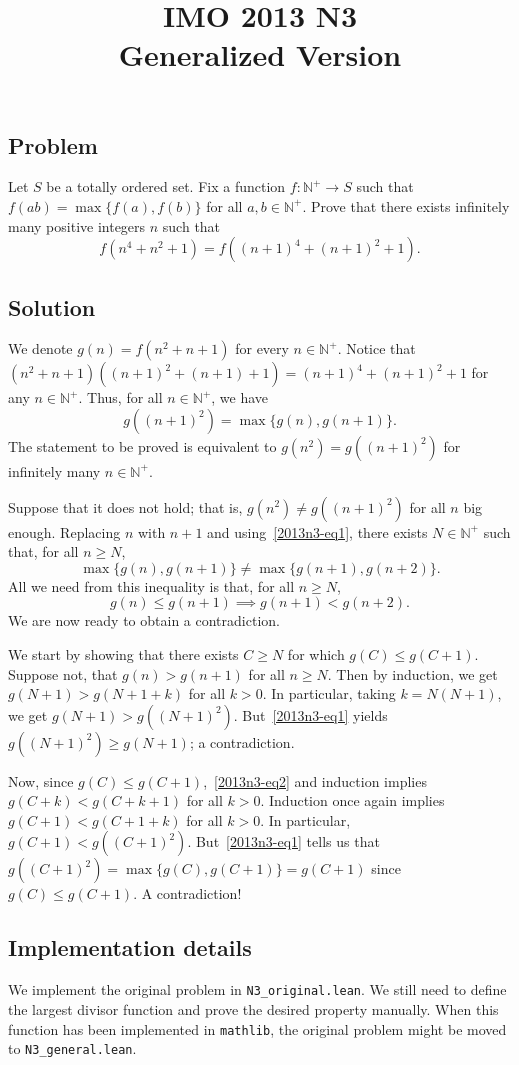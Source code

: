 \documentclass{article}
\title{IMO 2013 N3 \\ Generalized Version}
\author{}
\date{}
\newcommand{\N}{\mathbb{N}}
\begin{document}
\maketitle



\subsection*{Problem}

Let $S$ be a totally ordered set.
Fix a function $f : \N^+ \to S$ such that $f(ab) = \max\{f(a), f(b)\}$ for all $a, b \in \N^+$.
Prove that there exists infinitely many positive integers $n$ such that
\[ f(n^4 + n^2 + 1) = f((n + 1)^4 + (n + 1)^2 + 1). \]



\subsection*{Solution}

We denote $g(n) = f(n^2 + n + 1)$ for every $n \in \N^+$.
Notice that $(n^2 + n + 1)((n + 1)^2 + (n + 1) + 1) = (n + 1)^4 + (n + 1)^2 + 1$ for any $n \in \N^+$.
Thus, for all $n \in \N^+$, we have
\[ g((n + 1)^2) = \max\{g(n), g(n + 1)\}. \tag{1}\label{2013n3-eq1} \]
The statement to be proved is equivalent to $g(n^2) = g((n + 1)^2)$ for infinitely many $n \in \N^+$.

Suppose that it does not hold; that is, $g(n^2) \neq g((n + 1)^2)$ for all $n$ big enough.
Replacing $n$ with $n + 1$ and using~\eqref{2013n3-eq1}, there exists $N \in \N^+$ such that, for all $n \geq N$,
\[ \max\{g(n), g(n + 1)\} \neq \max\{g(n + 1), g(n + 2)\}. \]
All we need from this inequality is that, for all $n \geq N$,
\[ g(n) \leq g(n + 1) \implies g(n + 1) < g(n + 2). \tag{2}\label{2013n3-eq2} \]
We are now ready to obtain a contradiction.

We start by showing that there exists $C \geq N$ for which $g(C) \leq g(C + 1)$.
Suppose not, that $g(n) > g(n + 1)$ for all $n \geq N$.
Then by induction, we get $g(N + 1) > g(N + 1 + k)$ for all $k > 0$.
In particular, taking $k = N(N + 1)$, we get $g(N + 1) > g((N + 1)^2)$.
But~\eqref{2013n3-eq1} yields $g((N + 1)^2) \geq g(N + 1)$; a contradiction.

Now, since $g(C) \leq g(C + 1)$,~\eqref{2013n3-eq2} and induction implies $g(C + k) < g(C + k + 1)$ for all $k > 0$.
Induction once again implies $g(C + 1) < g(C + 1 + k)$ for all $k > 0$.
In particular, $g(C + 1) < g((C + 1)^2)$.
But~\eqref{2013n3-eq1} tells us that $g((C + 1)^2) = \max\{g(C), g(C + 1)\} = g(C + 1)$ since $g(C) \leq g(C + 1)$.
A contradiction!



\subsection*{Implementation details}

We implement the original problem in \texttt{N3\_original.lean}.
We still need to define the largest divisor function and prove the desired property manually.
When this function has been implemented in \texttt{mathlib}, the original problem might be moved to \texttt{N3\_general.lean}.
\end{document}
